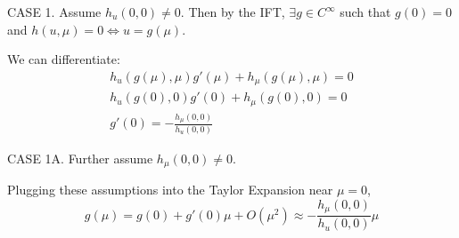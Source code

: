 \documentclass[12pt]{article}
\begin{document}
\begin{enumerate}
          CASE 1. Assume $h_u(0, 0) \neq 0$. Then by the IFT, $\exists g \in C^{\infty}$ such that $g(0) = 0$ and $h(u, \mu) = 0 \iff u = g(\mu)$.

          We can differentiate:
          \begin{gather*}
              h_u(g(\mu), \mu) g'(\mu) + h_{\mu}(g(\mu), \mu) = 0 \\
              h_u(g(0), 0) g'(0) + h_{\mu}(g(0), 0) = 0\\
              g'(0) = -\frac{h_{\mu}(0, 0)}{h_u(0, 0)}
          \end{gather*}

          CASE 1A. Further assume $h_{\mu}(0, 0) \neq 0$.

          Plugging these assumptions into the Taylor Expansion near $\mu = 0$,
          \[g(\mu) = g(0) + g'(0)\mu + O(\mu^2) \approx -\frac{h_{\mu}(0, 0)}{h_u(0, 0)} \mu\]


\end{enumerate}
\end{document}
